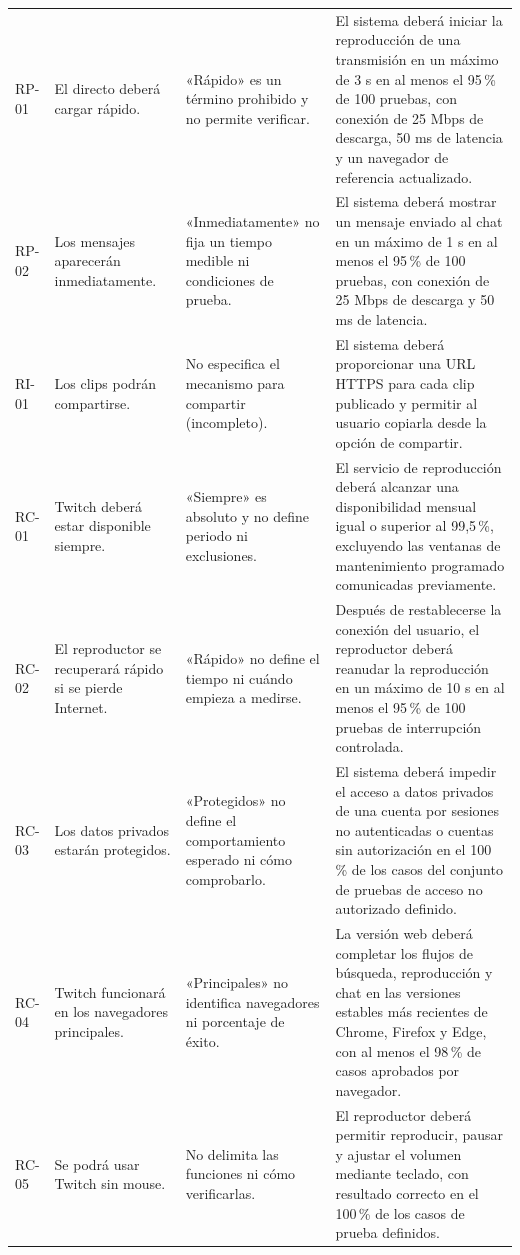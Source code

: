 \documentclass[10pt,a4paper]{article}
\begin{document}
{\begin{longtable}{@{}P{0.95cm} P{2.6cm} P{4.4cm} P{7.4cm}@{}}
RP-01 & El directo deberá cargar rápido. & «Rápido» es un término prohibido y no permite verificar. & El sistema deberá iniciar la reproducción de una transmisión en un máximo de 3 s en al menos el 95\,\% de 100 pruebas, con conexión de 25 Mbps de descarga, 50 ms de latencia y un navegador de referencia actualizado.\\
RP-02 & Los mensajes aparecerán inmediatamente. & «Inmediatamente» no fija un tiempo medible ni condiciones de prueba. & El sistema deberá mostrar un mensaje enviado al chat en un máximo de 1 s en al menos el 95\,\% de 100 pruebas, con conexión de 25 Mbps de descarga y 50 ms de latencia.\\
RI-01 & Los clips podrán compartirse. & No especifica el mecanismo para compartir (incompleto). & El sistema deberá proporcionar una URL HTTPS para cada clip publicado y permitir al usuario copiarla desde la opción de compartir.\\
RC-01 & Twitch deberá estar disponible siempre. & «Siempre» es absoluto y no define periodo ni exclusiones. & El servicio de reproducción deberá alcanzar una disponibilidad mensual igual o superior al 99,5\,\%, excluyendo las ventanas de mantenimiento programado comunicadas previamente.\\
RC-02 & El reproductor se recuperará rápido si se pierde Internet. & «Rápido» no define el tiempo ni cuándo empieza a medirse. & Después de restablecerse la conexión del usuario, el reproductor deberá reanudar la reproducción en un máximo de 10 s en al menos el 95\,\% de 100 pruebas de interrupción controlada.\\
RC-03 & Los datos privados estarán protegidos. & «Protegidos» no define el comportamiento esperado ni cómo comprobarlo. & El sistema deberá impedir el acceso a datos privados de una cuenta por sesiones no autenticadas o cuentas sin autorización en el 100\,\% de los casos del conjunto de pruebas de acceso no autorizado definido.\\
RC-04 & Twitch funcionará en los navegadores principales. & «Principales» no identifica navegadores ni porcentaje de éxito. & La versión web deberá completar los flujos de búsqueda, reproducción y chat en las versiones estables más recientes de Chrome, Firefox y Edge, con al menos el 98\,\% de casos aprobados por navegador.\\
RC-05 & Se podrá usar Twitch sin mouse. & No delimita las funciones ni cómo verificarlas. & El reproductor deberá permitir reproducir, pausar y ajustar el volumen mediante teclado, con resultado correcto en el 100\,\% de los casos de prueba definidos.\\

\end{longtable}}
\end{document}
